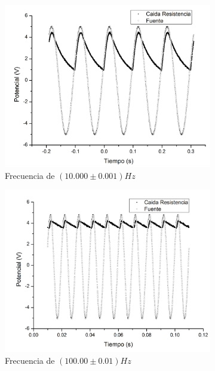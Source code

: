\documentclass[11pt,a4paper]{article}
\begin{document}
\begin{figure}[h]
\begin{subfigure}{0.33\textwidth}
\includegraphics[scale=0.23]{Rectificacion_10hz}
  \caption{Frecuencia de $(10.000\pm0.001)Hz$}
  \label{subfig:rec_10}
\end{subfigure}
\begin{subfigure}{0.33\textwidth}
\includegraphics[scale=0.23]{Rectificacion_100hz}
  \caption{Frecuencia de $(100.00\pm0.01)Hz$}
  \label{subfig:rec_100}
\end{subfigure}
\begin{subfigure}{0.33\textwidth}

\end{subfigure}
\end{figure}
\end{document}
